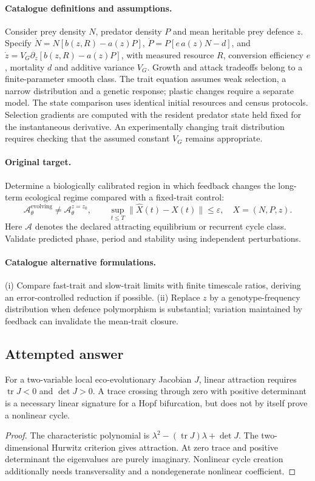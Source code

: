 \documentclass[11pt]{article}
\begin{document}
\paragraph{Catalogue definitions and assumptions.}
Consider prey density $N$, predator density $P$ and mean heritable prey defence $z$. Specify $\dot N=N[b(z,R)-a(z)P]$, $\dot P=P[e\,a(z)N-d]$, and $\dot z=V_G\partial_z[b(z,R)-a(z)P]$, with measured resource $R$, conversion efficiency $e$, mortality $d$ and additive variance $V_G$. Growth and attack tradeoffs belong to a finite-parameter smooth class. The trait equation assumes weak selection, a narrow distribution and a genetic response; plastic changes require a separate model. The state comparison uses identical initial resources and census protocols. Selection gradients are computed with the resident predator state held fixed for the instantaneous derivative. An experimentally changing trait distribution requires checking that the assumed constant $V_G$ remains appropriate.
\paragraph{Original target.}
Determine a biologically calibrated region in which feedback changes the long-term ecological regime compared with a fixed-trait control:
\[
 \mathcal A_\theta^{\mathrm{evolving}}
 \ne\mathcal A_\theta^{z=z_0},\qquad
 \sup_{t\le T}\|\widehat X(t)-X(t)\|\le\varepsilon,
 \quad X=(N,P,z).
\]
Here $\mathcal A$ denotes the declared attracting equilibrium or recurrent cycle class. Validate predicted phase, period and stability using independent perturbations.
\paragraph{Catalogue alternative formulations.}
(i) Compare fast-trait and slow-trait limits with finite timescale ratios, deriving an error-controlled reduction if possible. (ii) Replace $z$ by a genotype-frequency distribution when defence polymorphism is substantial; variation maintained by feedback can invalidate the mean-trait closure.
\subsection{Attempted answer}
\begin{proposition}
For a two-variable local eco-evolutionary Jacobian $J$, linear attraction requires $\operatorname{tr}J<0$ and $\det J>0$. A trace crossing through zero with positive determinant is a necessary linear signature for a Hopf bifurcation, but does not by itself prove a nonlinear cycle.
\end{proposition}
\begin{proof}
The characteristic polynomial is $\lambda^2-(\operatorname{tr}J)\lambda+\det J$. The two-dimensional Hurwitz criterion gives attraction. At zero trace and positive determinant the eigenvalues are purely imaginary. Nonlinear cycle creation additionally needs transversality and a nondegenerate nonlinear coefficient.
\end{proof}
\end{document}
